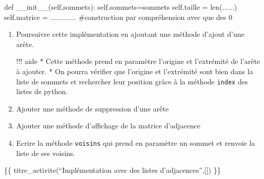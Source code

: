 \documentclass[
  letterpaper,
  DIV=11,
  numbers=noendperiod]{scrartcl}
\newenvironment{Shaded}{\begin{snugshade}}{\end{snugshade}}
\newcommand{\BuiltInTok}[1]{\textcolor[rgb]{0.00,0.23,0.31}{#1}}
\newcommand{\CommentTok}[1]{\textcolor[rgb]{0.37,0.37,0.37}{#1}}
\newcommand{\FunctionTok}[1]{\textcolor[rgb]{0.28,0.35,0.67}{#1}}
\newcommand{\KeywordTok}[1]{\textcolor[rgb]{0.00,0.23,0.31}{#1}}
\newcommand{\NormalTok}[1]{\textcolor[rgb]{0.00,0.23,0.31}{#1}}
\newcommand{\OperatorTok}[1]{\textcolor[rgb]{0.37,0.37,0.37}{#1}}
\newcommand{\VariableTok}[1]{\textcolor[rgb]{0.07,0.07,0.07}{#1}}
\begin{document}
\begin{enumerate}
\begin{Shaded}
\begin{Highlighting}[]
    \KeywordTok{def} \FunctionTok{\_\_init\_\_}\NormalTok{(}\VariableTok{self}\NormalTok{,sommets):}
        \VariableTok{self}\NormalTok{.sommets}\OperatorTok{=}\NormalTok{sommets}
        \VariableTok{self}\NormalTok{.taille }\OperatorTok{=} \BuiltInTok{len}\NormalTok{(......)}
        \VariableTok{self}\NormalTok{.matrice }\OperatorTok{=}\NormalTok{ .............  }\CommentTok{\#construction par compréhension avec que des 0}
\end{Highlighting}
\end{Shaded}

  \begin{enumerate}
  \def\labelenumii{\arabic{enumii}.}
  \setcounter{enumii}{1}
  \item
    Poursuivre cette implémentation en ajoutant une méthode d'ajout
    d'une arête.

    !!! aide * Cette méthode prend en paramètre l'origine et l'extrémité
    de l'arête à ajouter. * On pourra vérifier que l'origine et
    l'extrémité sont bien dans la liste de sommets et rechercher leur
    position grâce à la méthode \texttt{index} des listes de python.
  \item
    Ajouter une méthode de suppression d'une arête
  \item
    Ajouter une méthode d'affichage de la matrice d'adjacence
  \item
    Ecrire la méthode \texttt{voisins} qui prend en paramètre un sommet
    et renvoie la liste de ses voisins.
  \end{enumerate}
\end{enumerate}

\{\{ titre\_activite(``Implémentation avec des listes
d'adjacences'',{[}{]}) \}\}
\end{document}
